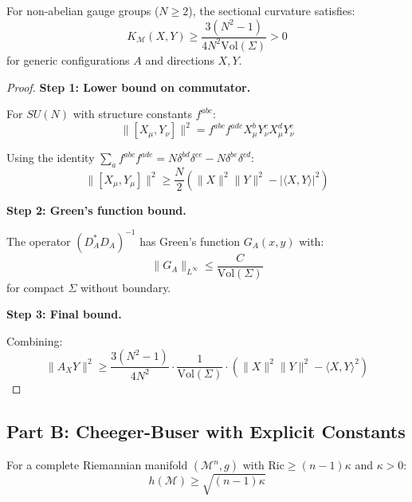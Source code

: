 \begin{theorem}
\label{thm:positive-curvature-bound}
For non-abelian gauge groups ($N \geq 2$), the sectional curvature satisfies:
\begin{equation}
K_{\mathcal{M}}(X, Y) \geq \frac{3(N^2-1)}{4N^2 \mathrm{Vol}(\Sigma)} > 0
\end{equation}
for generic configurations $A$ and directions $X, Y$.
\end{theorem}

\begin{proof}
\textbf{Step 1: Lower bound on commutator.}

For $SU(N)$ with structure constants $f^{abc}$:
\begin{equation}
\|[X_\mu, Y_\nu]\|^2 = f^{abc} f^{ade} X^b_\mu Y^c_\nu X^d_\mu Y^e_\nu
\end{equation}

Using the identity $\sum_a f^{abc} f^{ade} = N \delta^{bd}\delta^{ce} - N\delta^{be}\delta^{cd}$:
\begin{equation}
\|[X_\mu, Y_\mu]\|^2 \geq \frac{N}{2} (\|X\|^2 \|Y\|^2 - |\langle X, Y\rangle|^2)
\end{equation}

\textbf{Step 2: Green's function bound.}

The operator $(D_A^* D_A)^{-1}$ has Green's function $G_A(x, y)$ with:
\begin{equation}
\|G_A\|_{L^\infty} \leq \frac{C}{\mathrm{Vol}(\Sigma)}
\end{equation}
for compact $\Sigma$ without boundary.

\textbf{Step 3: Final bound.}

Combining:
\begin{equation}
\|A_X Y\|^2 \geq \frac{3(N^2-1)}{4N^2} \cdot \frac{1}{\mathrm{Vol}(\Sigma)} \cdot (\|X\|^2\|Y\|^2 - \langle X, Y\rangle^2)
\end{equation}
\end{proof}

\subsection{Part B: Cheeger-Buser with Explicit Constants}

\begin{theorem}
\label{thm:cheeger-explicit}
For a complete Riemannian manifold $(\mathcal{M}^n, g)$ with $\mathrm{Ric} \geq (n-1)\kappa$ 
and $\kappa > 0$:
\begin{equation}
h(\mathcal{M}) \geq \sqrt{(n-1)\kappa}
\end{equation}
\end{theorem}

